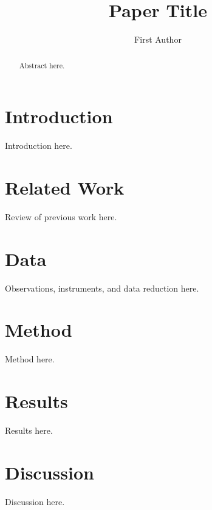 \documentclass{aastex701}
\begin{document}
\title{Paper Title}

\author{First Author}

\begin{abstract}
Abstract here.
\end{abstract}


\section{Introduction}
\label{sec:intro}
Introduction here.

\section{Related Work}
\label{sec:related_work}
Review of previous work here.

\section{Data}
\label{sec:data}
Observations, instruments, and data reduction here.

\section{Method}
\label{sec:method}
Method here.

\section{Results}
\label{sec:results}
Results here.

\section{Discussion}
\label{sec:discussion}
Discussion here.
\end{document}
